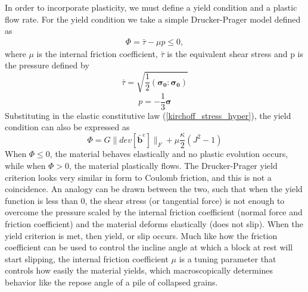 In order to incorporate plasticity, we must define a yield condition and a plastic flow rate. For the yield condition we take a simple Drucker-Prager model defined as
\begin{align}
\Phi = \bar{\tau} - \mu p \leq 0,
\end{align}
where $\mu$ is the internal friction coefficient, $\bar{\tau}$ is the equivalent shear stress and p is the pressure defined by
\begin{equation}
\bar{\tau}=\sqrt{\frac{1}{2}(\bm{\sigma_0}:\bm{\sigma_0})}\label{tau_bar}
\end{equation}
\begin{equation}
p=-\frac{1}{3}\bm{\sigma}\label{pressure_stress}
\end{equation}
Substituting in the elastic constitutive law (\ref{kirchoff_stress_hyper}), the yield condition can also be expressed as
\begin{equation}
\Phi = G \|  dev[ \bar{\bm{b}}^e ] \|_F + \mu \frac{\kappa}{2} \left( J^2 - 1 \right) \label{yield_hyper_strain}
\end{equation}
When $\Phi \leq 0$, the material behaves elastically and no plastic evolution occurs, while when $\Phi > 0$, the material plastically flows. The Drucker-Prager yield criterion looks very similar in form to Coulomb friction, and this is not a coincidence. An analogy can be drawn between the two, such that when the yield function is less than 0, the shear stress (or tangential force) is not enough to overcome the pressure scaled by the internal friction coefficient (normal force and friction coefficient) and the material deforms elastically (does not slip). When the yield criterion is met, then yield, or slip occurs. Much like how the friction coefficient can be used to control the incline angle at which a block at rest will start slipping, the internal friction coefficient $\mu$ is a tuning parameter that controls how easily the material yields, which macroscopically determines behavior like the repose angle of a pile of collapsed grains.

